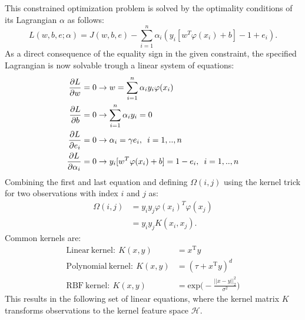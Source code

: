 \documentclass[preprint,12pt]{elsarticle}
\begin{document}
	This constrained optimization problem is solved by the optimality conditions of its Lagrangian $\alpha$ as follows:
	\begin{equation}
	L(w,b,e;\alpha) = J(w,b,e) - \sum_{i=1}^{n} \alpha_i(y_i [ w^T \varphi(x_i) + b]-1 + e_i).
	\label{eq:lagrangian}
	\end{equation}
	As a direct consequence of the equality sign in the given constraint, the specified Lagrangian is now solvable trough a linear system of equations:
	\begin{align}
	\frac{\partial L}{\partial w} &= 0 \rightarrow w = \sum_{i=1}^{n} \alpha_i y_i \varphi(x_i) \\
	\frac{\partial L}{\partial b} &= 0 \rightarrow \sum_{i=1}^n \alpha_i y_i = 0 \\
	\frac{\partial L}{\partial e_i} &= 0 \rightarrow \alpha_i = \gamma e_i,  \enskip i = 1,..,n \\
	\frac{\partial L}{\partial \alpha_i} &= 0 \rightarrow y_i [w^T \varphi(x_i) + b ] = 1 - e_i, \enskip i = 1,..,n	
	\end{align}
	Combining the first and last equation and defining $\Omega{(i,j)}$ using the kernel trick for two observations with index $i$ and $j$ as:
	\begin{align}
	\Omega{(i,j)} &= y_i y_j \varphi(x_i)^T \varphi(x_j) \\
	&= y_i y_j K(x_i, x_j).
	\end{align}
	Common kernels are:
	\begin{align}
	\mathrm{Linear} \  \mathrm{kernel:} \ K(x,y) &= x^\mathrm{T}y \\
	\mathrm{Polynomial} \ \mathrm{kernel:} \ K(x,y) &= (\tau + x^\mathrm{T}y)^d \\
	\mathrm{RBF} \ \mathrm{kernel:} \ K(x,y) &= \mathrm{exp}\Big(-\frac{||x-y||_2^2}{\sigma^2}\Big) 
	\end{align}
	This results in the following set of linear equations, where the kernel matrix $K$ transforms observations to the kernel feature space $\mathcal{H}$.
	
\end{document}
